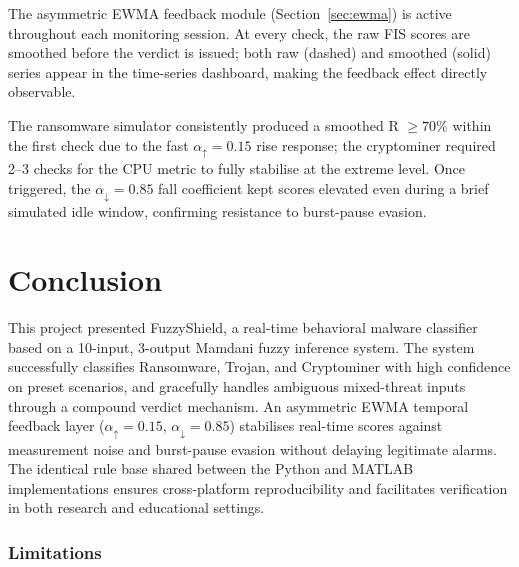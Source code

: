 \documentclass[conference]{IEEEtran}
\begin{document}
The asymmetric EWMA feedback module (Section~\ref{sec:ewma}) is active
throughout each monitoring session. At every check, the raw FIS scores
are smoothed before the verdict is issued; both raw (dashed) and smoothed
(solid) series appear in the time-series dashboard, making the feedback
effect directly observable.

The ransomware simulator consistently produced a smoothed R $\geq 70\%$
within the first check due to the fast $\alpha_{\uparrow}=0.15$ rise
response; the cryptominer required 2--3 checks for the CPU metric to
fully stabilise at the extreme level. Once triggered, the
$\alpha_{\downarrow}=0.85$ fall coefficient kept scores elevated even
during a brief simulated idle window, confirming resistance to burst-pause
evasion.

\section{Conclusion}

This project presented FuzzyShield, a real-time behavioral malware
classifier based on a 10-input, 3-output Mamdani fuzzy inference system.
The system successfully classifies Ransomware, Trojan, and Cryptominer
with high confidence on preset scenarios, and gracefully handles
ambiguous mixed-threat inputs through a compound verdict mechanism.
An asymmetric EWMA temporal feedback layer ($\alpha_{\uparrow}=0.15$,
$\alpha_{\downarrow}=0.85$) stabilises real-time scores against
measurement noise and burst-pause evasion without delaying legitimate
alarms. The identical rule base shared between the Python and MATLAB
implementations ensures cross-platform reproducibility and facilitates
verification in both research and educational settings.

\subsubsection*{Limitations}
\end{document}
